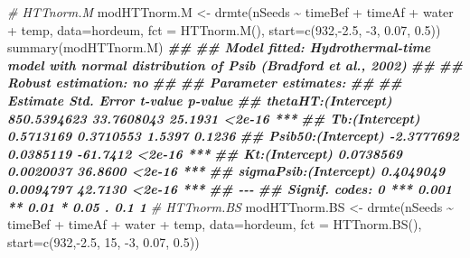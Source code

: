 \documentclass[
]{book}
\newenvironment{Shaded}{\begin{snugshade}}{\end{snugshade}}
\newcommand{\AttributeTok}[1]{\textcolor[rgb]{0.77,0.63,0.00}{#1}}
\newcommand{\CommentTok}[1]{\textcolor[rgb]{0.56,0.35,0.01}{\textit{#1}}}
\newcommand{\DecValTok}[1]{\textcolor[rgb]{0.00,0.00,0.81}{#1}}
\newcommand{\DocumentationTok}[1]{\textcolor[rgb]{0.56,0.35,0.01}{\textbf{\textit{#1}}}}
\newcommand{\FloatTok}[1]{\textcolor[rgb]{0.00,0.00,0.81}{#1}}
\newcommand{\FunctionTok}[1]{\textcolor[rgb]{0.00,0.00,0.00}{#1}}
\newcommand{\NormalTok}[1]{#1}
\newcommand{\OtherTok}[1]{\textcolor[rgb]{0.56,0.35,0.01}{#1}}
\newcommand{\SpecialCharTok}[1]{\textcolor[rgb]{0.00,0.00,0.00}{#1}}
\begin{document}
\begin{Shaded}
\begin{Highlighting}[]
\CommentTok{\# HTTnorm.M}
\NormalTok{modHTTnorm.M }\OtherTok{\textless{}{-}} \FunctionTok{drmte}\NormalTok{(nSeeds }\SpecialCharTok{\textasciitilde{}}\NormalTok{ timeBef }\SpecialCharTok{+}\NormalTok{ timeAf }\SpecialCharTok{+}\NormalTok{ water }\SpecialCharTok{+}\NormalTok{ temp,}
                 \AttributeTok{data=}\NormalTok{hordeum,}
                 \AttributeTok{fct =} \FunctionTok{HTTnorm.M}\NormalTok{(),}
  \AttributeTok{start=}\FunctionTok{c}\NormalTok{(}\DecValTok{932}\NormalTok{,}\SpecialCharTok{{-}}\FloatTok{2.5}\NormalTok{, }\SpecialCharTok{{-}}\DecValTok{3}\NormalTok{, }\FloatTok{0.07}\NormalTok{, }\FloatTok{0.5}\NormalTok{))}
\FunctionTok{summary}\NormalTok{(modHTTnorm.M)}
\DocumentationTok{\#\# }
\DocumentationTok{\#\# Model fitted: Hydrothermal{-}time model with normal distribution of Psib (Bradford et al., 2002)}
\DocumentationTok{\#\# }
\DocumentationTok{\#\# Robust estimation: no }
\DocumentationTok{\#\# }
\DocumentationTok{\#\# Parameter estimates:}
\DocumentationTok{\#\# }
\DocumentationTok{\#\#                          Estimate  Std. Error  t{-}value p{-}value    }
\DocumentationTok{\#\# thetaHT:(Intercept)   850.5394623  33.7608043  25.1931  \textless{}2e{-}16 ***}
\DocumentationTok{\#\# Tb:(Intercept)          0.5713169   0.3710553   1.5397  0.1236    }
\DocumentationTok{\#\# Psib50:(Intercept)     {-}2.3777692   0.0385119 {-}61.7412  \textless{}2e{-}16 ***}
\DocumentationTok{\#\# Kt:(Intercept)          0.0738569   0.0020037  36.8600  \textless{}2e{-}16 ***}
\DocumentationTok{\#\# sigmaPsib:(Intercept)   0.4049049   0.0094797  42.7130  \textless{}2e{-}16 ***}
\DocumentationTok{\#\# {-}{-}{-}}
\DocumentationTok{\#\# Signif. codes:  0 \textquotesingle{}***\textquotesingle{} 0.001 \textquotesingle{}**\textquotesingle{} 0.01 \textquotesingle{}*\textquotesingle{} 0.05 \textquotesingle{}.\textquotesingle{} 0.1 \textquotesingle{} \textquotesingle{} 1}
\CommentTok{\# HTTnorm.BS}
\NormalTok{modHTTnorm.BS }\OtherTok{\textless{}{-}} \FunctionTok{drmte}\NormalTok{(nSeeds }\SpecialCharTok{\textasciitilde{}}\NormalTok{ timeBef }\SpecialCharTok{+}\NormalTok{ timeAf }\SpecialCharTok{+}\NormalTok{ water }\SpecialCharTok{+}\NormalTok{ temp,}
                 \AttributeTok{data=}\NormalTok{hordeum,}
                 \AttributeTok{fct =} \FunctionTok{HTTnorm.BS}\NormalTok{(),}
  \AttributeTok{start=}\FunctionTok{c}\NormalTok{(}\DecValTok{932}\NormalTok{,}\SpecialCharTok{{-}}\FloatTok{2.5}\NormalTok{, }\DecValTok{15}\NormalTok{, }\SpecialCharTok{{-}}\DecValTok{3}\NormalTok{, }\FloatTok{0.07}\NormalTok{, }\FloatTok{0.5}\NormalTok{))}

\end{Highlighting}
\end{Shaded}
\end{document}
